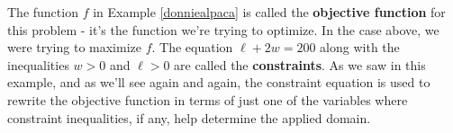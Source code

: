 The function $f$ in Example \ref{donniealpaca} is called the \textbf{objective function} for this problem - it's the function we're trying to optimize.  In the case above, we were trying to maximize $f$. The equation  $\ell+2w = 200$ along with the inequalities $w>0$ and $\ell >0$ are called the \textbf{constraints}.   As we saw in this example, and as we'll see again and again, the constraint equation is used to rewrite the objective function in terms of just one of the variables where constraint inequalities, if any, help determine the applied domain.

